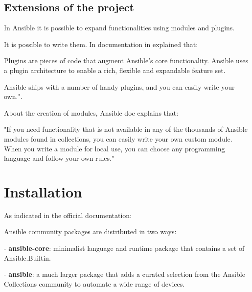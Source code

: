\documentclass[12pt,a4paper,openright,twoside]{book}
\begin{document}

\subsection{Extensions of the project}
In Ansible it is possible to expand functionalities using modules and plugins.


It is possible to write them. In documentation in explained that:


Plugins are pieces of code that augment Ansible’s core functionality. Ansible uses a plugin architecture to enable a rich, flexible and expandable feature set.


Ansible ships with a number of handy plugins, and you can easily write your own."\cite{ansibleDocPlugins}.


About the creation of modules, Ansible doc explains that:


"If you need functionality that is not available in any of the thousands of Ansible modules found in collections, you can easily write your own custom module. When you write a module for local use, you can choose any programming language and follow your own rules."\cite{ansibleDocNewModules}

\section{Installation}
As indicated in the official documentation\cite{ansibleDocInstall}:

Ansible community packages are distributed in two ways:

- \textbf{ansible-core}: minimalist language and runtime package that contains a set of Ansible.Builtin.

- \textbf{ansible}: a much larger package that adds a curated selection from the Ansible Collections community to automate a wide range of devices.
\end{document}
